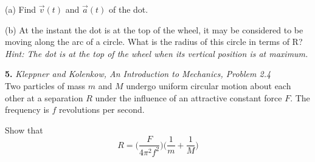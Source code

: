 \documentclass[11pt]{article}
\theoremstyle{gangnamstyle}{\newtheorem{definition}{Definition}[]}
\theoremstyle{gangnamstyle}{\newtheorem{example}{Example}[]}
\theoremstyle{gangnamstyle}{\newtheorem{problem}{Problem}[]}
\begin{document}
(a) Find $\Vec{v}(t)$ and $\Vec{a}(t)$ of the dot.

(b) At the instant the dot is at the top of the wheel, it may be considered to be moving along the arc of a circle. What is the radius of this circle in terms of R? \\
\textit{Hint: The dot is at the top of the wheel when its vertical position is at maximum. }

\pagebreak

\textbf{5.} \textit{Kleppner and Kolenkow, An Introduction to Mechanics, Problem 2.4} \\

Two particles of mass $m$ and $M$ undergo uniform circular motion
about each other at a separation $R$ under the influence of an attractive constant force $F$. The frequency is $f$ revolutions per second. 

Show that 
\[ R = \Big( \frac{F}{4\pi^2f^2} \Big) \Big( \frac{1}{m} + \frac{1}{M} \Big) \]
\end{document}
